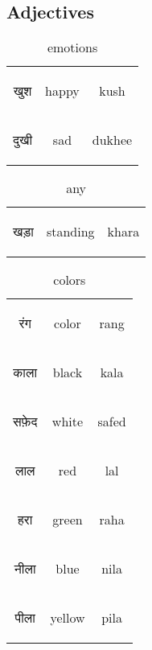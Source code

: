 \newpage  
\subsection{Adjectives}

\begin{table}[H]
    \centering
    \begin{tabular}{c|c|c}        
    \begin{hindi} खुश \end{hindi} & happy & kush \\
    \begin{hindi} दुखी \end{hindi} & sad & dukhee \\
    \end{tabular}
    \caption{emotions}
    \label{tab:adjective_emotions}
\end{table}

\begin{table}[H]
    \centering
    \begin{tabular}{c|c|c}        
    \begin{hindi} खड़ा \end{hindi} & standing & khara \\
    \end{tabular}
    \caption{any}
    \label{tab:adjective_any}
\end{table}


\begin{table}[H]
    \centering
    \begin{tabular}{c|c|c}        
    \begin{hindi} रंग \end{hindi} & color & rang \\
    \begin{hindi} काला \end{hindi} & black & kala \\
    \begin{hindi} सफ़ेद \end{hindi} & white & safed \\
    \begin{hindi} लाल\end{hindi} & red & lal \\
    \begin{hindi} हरा\end{hindi} & green & raha \\
    \begin{hindi} नीला\end{hindi} & blue & nila \\
    \begin{hindi} पीला\end{hindi} & yellow & pila \\
    \end{tabular}
    \caption{colors}
    \label{tab:adjective_colors}
\end{table}

